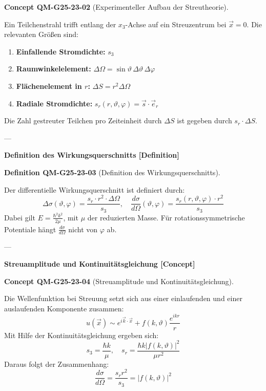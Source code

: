 \documentclass[10pt, letterpaper]{article}
\newcommand{\CustomHeading}[3]{%
  \par\medskip\noindent%
  \textbf{#1 #2} \textnormal{(#3)}.\enskip%
}
\newenvironment{DEF}[2]{\begin{unitbox}\CustomHeading{Definition}{#1}{#2}}{\end{unitbox}}
\newenvironment{CONC}[2]{\begin{unitbox}\CustomHeading{Concept}{#1}{#2}}{\end{unitbox}}
\begin{document}
\begin{CONC}{QM-G25-23-02}{Experimenteller Aufbau der Streutheorie}
Ein Teilchenstrahl trifft entlang der $x_3$-Achse auf ein Streuzentrum bei $\vec{x} = 0$. Die relevanten Größen sind:

\begin{enumerate}
  \item \textbf{Einfallende Stromdichte:} $s_3$
  \item \textbf{Raumwinkelelement:} $\Delta\Omega = \sin\vartheta \, \Delta\vartheta \, \Delta\varphi$
  \item \textbf{Flächenelement in $r$:} $\Delta S = r^2 \Delta \Omega$
  \item \textbf{Radiale Stromdichte:} $s_r(r, \vartheta, \varphi) = \vec{s} \cdot \vec{e}_r$
\end{enumerate}

Die Zahl gestreuter Teilchen pro Zeiteinheit durch $\Delta S$ ist gegeben durch $s_r \cdot \Delta S$.
\end{CONC}

---

\textbf{Definition des Wirkungsquerschnitts [Definition]}

\begin{DEF}{QM-G25-23-03}{Definition des Wirkungsquerschnitts}
Der differentielle Wirkungsquerschnitt ist definiert durch:
\[
\Delta \sigma(\vartheta, \varphi) = \frac{s_r \cdot r^2 \cdot \Delta \Omega}{s_3}, \quad
\frac{d\sigma}{d\Omega}(\vartheta, \varphi) = \frac{s_r(r, \vartheta, \varphi) \cdot r^2}{s_3}
\]
Dabei gilt $E = \frac{\hbar^2 k^2}{2\mu}$, mit $\mu$ der reduzierten Masse. Für rotationssymmetrische Potentiale hängt $\frac{d\sigma}{d\Omega}$ nicht von $\varphi$ ab.
\end{DEF}

---

\textbf{Streuamplitude und Kontinuitätsgleichung [Concept]}

\begin{CONC}{QM-G25-23-04}{Streuamplitude und Kontinuitätsgleichung}
Die Wellenfunktion bei Streuung setzt sich aus einer einlaufenden und einer auslaufenden Komponente zusammen:
\[
u(\vec{x}) \sim e^{i \vec{k} \cdot \vec{x}} + f(k, \vartheta) \frac{e^{ikr}}{r}
\]
Mit Hilfe der Kontinuitätsgleichung ergeben sich:
\[
s_3 = \frac{\hbar k}{\mu}, \quad
s_r = \frac{\hbar k |f(k, \vartheta)|^2}{\mu r^2}
\]
Daraus folgt der Zusammenhang:
\[
\frac{d\sigma}{d\Omega} = \frac{s_r r^2}{s_3} = |f(k, \vartheta)|^2
\]
\end{CONC}
\end{document}
